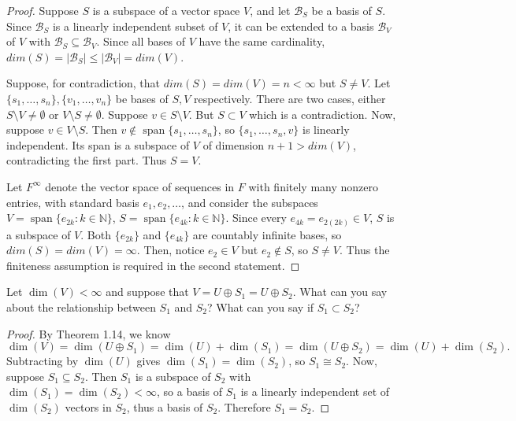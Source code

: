 \begin{proof}
    Suppose $S$ is a subspace of a vector space $V$, and let $\mathcal{B}_S$ be a basis of $S$.
    Since $\mathcal{B}_S$ is a linearly independent subset of $V$, it can be extended to a basis
        $\mathcal{B}_V$ of $V$ with $\mathcal{B}_S \subseteq \mathcal{B}_V$.
    Since all bases of $V$ have the same cardinality, $dim(S) = |\mathcal{B}_S| \le |\mathcal{B}_V| = dim(V)$.

    Suppose, for contradiction, that $dim(S) = dim(V) = n < \infty$ but $S \ne V$.
    Let $\{s_1, \ldots, s_n\}, \{v_1, \ldots, v_n\}$ be bases of $S, V$ respectively.
    There are two cases, either $S \setminus V \ne \emptyset$ or $V \setminus S \ne \emptyset$.
    Suppose $v \in S \setminus V$.
    But $S \subset V$ which is a contradiction.
    Now, suppose $v \in V \setminus S$.
    Then $v \notin \operatorname{span}\{s_1, \ldots, s_n\}$, so $\{s_1, \ldots, s_n, v\}$ is linearly independent.
    Its span is a subspace of $V$ of dimension $n + 1 > dim(V)$, contradicting the first part.
    Thus $S = V$.

    Let $F^\infty$ denote the vector space of sequences in $F$ with finitely many nonzero entries,
        with standard basis $e_1, e_2, \dots$, and consider the subspaces
        $V = \operatorname{span}\{e_{2k} : k \in \mathbb{N}\}$,
           $S = \operatorname{span}\{e_{4k} : k \in \mathbb{N}\}$.
    Since every $e_{4k} = e_{2(2k)} \in V$, $S$ is a subspace of $V$.
    Both $\{e_{2k}\}$ and $\{e_{4k}\}$ are countably infinite bases, so $dim(S) = dim(V) = \infty$.
    Then, notice $e_2 \in V$ but $e_2 \notin S$, so $S \neq V$.
    Thus the finiteness assumption is required in the second statement.
\end{proof}

\begin{tcolorbox}[title=Problem 12, breakable]
    Let $\dim(V) < \infty$ and suppose that $V = U \oplus S_1 = U \oplus S_2$. What can you
    say about the relationship between $S_1$ and $S_2$? What can you say if
    $S_1 \subset S_2$?
\end{tcolorbox}

\begin{proof}
    By Theorem 1.14, we know 
        \[\dim(V) = \dim(U \oplus S_1) = \dim(U) + \dim(S_1) = \dim(U \oplus S_2) = \dim(U) + \dim(S_2).\]
    Subtracting by $\dim(U)$ gives $\dim(S_1) = \dim(S_2)$, so $S_1 \cong S_2$.
    Now, suppose $S_1 \subseteq S_2$.
    Then $S_1$ is a subspace of $S_2$ with $\dim(S_1) = \dim(S_2) < \infty$, so a basis of
    $S_1$ is a linearly independent set of $\dim(S_2)$ vectors in $S_2$, thus a basis of $S_2$.
    Therefore $S_1 = S_2$.
\end{proof}

